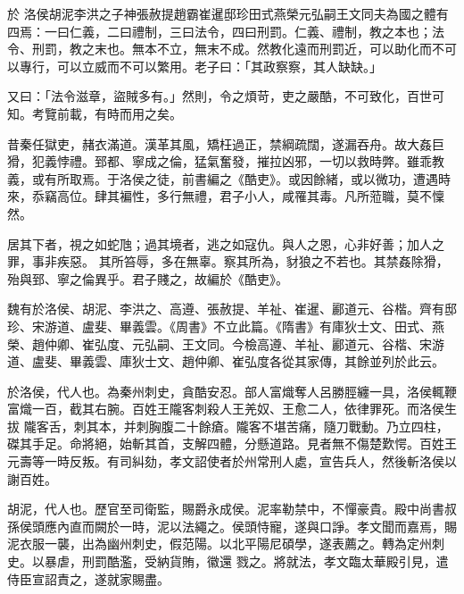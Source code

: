 
\begin{pinyinscope}

 於
 洛侯胡泥李洪之子神張赦提趙霸崔暹邸珍田式燕榮元弘嗣王文同夫為國之體有四焉：一曰仁義，二曰禮制，三曰法令，四曰刑罰。仁義、禮制，教之本也；法令、刑罰，教之末也。無本不立，無末不成。然教化遠而刑罰近，可以助化而不可
 以專行，可以立威而不可以繁用。老子曰：「其政察察，其人缺缺。」



 又曰：「法令滋章，盜賊多有。」然則，令之煩苛，吏之嚴酷，不可致化，百世可知。考覽前載，有時而用之矣。



 昔秦任獄吏，赭衣滿道。漢革其風，矯枉過正，禁綱疏闊，遂漏吞舟。故大姦巨猾，犯義悖禮。郅都、寧成之倫，猛氣奮發，摧拉凶邪，一切以救時弊。雖乖教義，或有所取焉。于洛侯之徒，前書編之《酷吏》。或因餘緒，或以微功，遭遇時來，忝竊高位。肆其褊性，多行無禮，君子小人，咸罹其毒。凡所蒞職，莫不懍然。



 居其下者，視之如蛇虺；過其境者，逃之如寇仇。與人之恩，心非好善；加人之罪，事非疾惡。
 其所笞辱，多在無辜。察其所為，豺狼之不若也。其禁姦除猾，殆與郅、寧之倫異乎。君子賤之，故編於《酷吏》。



 魏有於洛侯、胡泥、李洪之、高遵、張赦提、羊祉、崔暹、酈道元、谷楷。齊有邸珍、宋游道、盧斐、畢義雲。《周書》不立此篇。《隋書》有庫狄士文、田式、燕榮、趙仲卿、崔弘度、元弘嗣、王文同。今檢高遵、羊祉、酈道元、谷楷、宋游道、盧斐、畢義雲、庫狄士文、趙仲卿、崔弘度各從其家傳，其餘並列於此云。



 於洛侯，代人也。為秦州刺史，貪酷安忍。部人富熾奪人呂勝脛纏一具，洛侯輒鞭富熾一百，截其右腕。百姓王隴客刺殺人王羌奴、王愈二人，依律罪死。而洛侯生拔
 隴客舌，刺其本，并刺胸腹二十餘瘡。隴客不堪苦痛，隨刀戰動。乃立四柱，磔其手足。命將絕，始斬其首，支解四體，分懸道路。見者無不傷楚歎愕。百姓王元壽等一時反叛。有司糾劾，孝文詔使者於州常刑人處，宣告兵人，然後斬洛侯以謝百姓。



 胡泥，代人也。歷官至司衛監，賜爵永成侯。泥率勒禁中，不憚豪貴。殿中尚書叔孫侯頭應內直而闕於一時，泥以法繩之。侯頭恃寵，遂與口諍。孝文聞而嘉焉，賜泥衣服一襲，出為幽州刺史，假范陽。以北平陽尼碩學，遂表薦之。轉為定州刺史。以暴虐，刑罰酷濫，受納貨賄，徽還
 戮之。將就法，孝文臨太華殿引見，遣侍臣宣詔責之，遂就家賜盡。




\end{pinyinscope}
